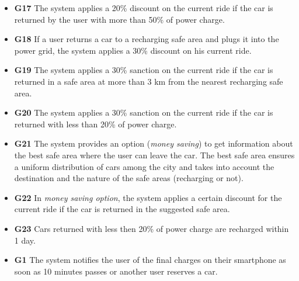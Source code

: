 \begin{itemize}
				\item \textbf{G17} The system applies a 20\% discount on the current ride if the car is returned by the user with more than 50\% of power charge.
				\item \textbf{G18} If a user returns a car to a recharging safe area and plugs it into the power grid, the system applies a 30\% discount on his current ride.
				\item \textbf{G19} The system applies a 30\% sanction on the current ride if the car is returned in a safe area at more than 3 km from the nearest recharging safe area.
				\item \textbf{G20} The system applies a 30\% sanction on the current ride if the car is returned with less than 20\% of power charge.
				\item \textbf{G21} The system provides an option (\textit{money saving}) to get information about the best safe area where the user can leave the car. The best safe area ensures a uniform distribution of cars among the city and takes into account the destination and the nature of the safe areas (recharging or not). %
				\item \textbf{G22} In \textit{money saving option}, the system applies a certain discount for the current ride if the car is returned in the suggested safe area. %
				\item \textbf{G23} Cars returned with less then 20\% of power charge are recharged within 1 day. %
				
				
				\item \textbf{G1} The system notifies the user of the final charges on their smartphone as soon as 10 minutes passes or another user reserves a car. %
			\end{itemize}
